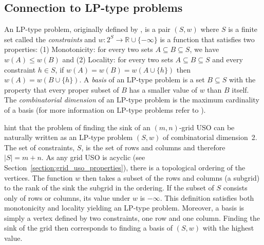 \documentclass[runningheads,a4paper]{llncs}
\begin{document}
\subsection{Connection to LP-type problems}
An LP-type problem, originally defined by \citet{SharirW92}, is a pair $(S,w)$ where $S$ is a finite set called the \emph{constraints} and
$w:2^S \rightarrow \mathbb{R} \cup \{-\infty\}$ is a function 
that satisfies two properties: (1) Monotonicity: for every two sets $A \subseteq B \subseteq S$, we have $w(A) \leq w(B) $ and
(2) Locality: for every two sets $A \subseteq B \subseteq S$ and every constraint $h \in S$, if $w(A) = w(B) = w(A\cup \{h\})$ then 
$w(A) = w(B \cup \{h\})$.
A \emph{basis} of an LP-type problem is a set $B \subseteq S$ with the property that every proper subset
of $B$ has a smaller value of $w$ than $B$ itself. The \emph{combinatorial dimension} of an LP-type problem 
is the maximum cardinality of a basis (for more information on LP-type problems refer to \cite{MatousekSW96}).

\citet{grid08} hint that the problem of finding the sink of an $(m,n)$-grid USO can be naturally written as an LP-type problem $(S,w)$ of combinatorial dimension~2. 
The set of constraints, $S$, is the set of rows and columns and therefore $|S| = m + n$. As any grid USO is acyclic (see Section~\ref{section:grid_uso_properties}), there is a topological ordering of the vertices. The function $w$ then takes a subset of the rows and columns (a subgrid) to the rank of the sink the subgrid in the ordering. If the subset of $S$ consists only of rows or columns, its value under $w$ is $-\infty$. 
This definition satisfies both monotonicity and locality yielding an LP-type problem.
Moreover, a basis is simply a vertex defined by two constraints, one row and one column.
Finding the sink of the grid then corresponds to finding a basis of $(S,w)$ with the highest value.
\end{document}
